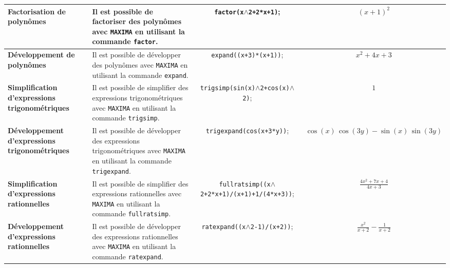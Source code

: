 \documentclass[8pt,landscape]{article}
\begin{document}
\begin{center}
\begin{longtable}{@{}p{4cm}p{10cm}cc@{}}
\midrule

\textbf{Factorisation de polynômes} & Il est possible de factoriser des polynômes avec \texttt{MAXIMA} en utilisant la commande \texttt{factor}. & \texttt{factor(x$\wedge$2+2*x+1)}; & $(x+1)^2$ \\

\midrule

\textbf{Développement de polynômes} & Il est possible de développer des polynômes avec \texttt{MAXIMA} en utilisant la commande \texttt{expand}. & \texttt{expand((x+3)*(x+1))}; & $x^2+4x+3$ \\

\midrule

\textbf{Simplification d'expressions trigonométriques} & Il est possible de simplifier des expressions trigonométriques avec \texttt{MAXIMA} en utilisant la commande \texttt{trigsimp}. & \texttt{trigsimp(sin(x)$\wedge$2+cos(x)$\wedge$2)}; & $1$ \\

\midrule

\textbf{Développement d'expressions trigonométriques} & Il est possible de développer des expressions trigonométriques avec \texttt{MAXIMA} en utilisant la commande \texttt{trigexpand}. & \texttt{trigexpand(cos(x+3*y))}; & $\cos{(x)}\,\cos{(3y)}-\sin{(x)}\,\sin{(3y)}$ \\

\midrule

\textbf{Simplification d'expressions rationnelles} & Il est possible de simplifier des expressions rationnelles avec \texttt{MAXIMA} en utilisant la commande \texttt{fullratsimp}. & \tiny{\texttt{fullratsimp((x$\wedge$2+2*x+1)/(x+1)+1/(4*x+3))}}; & $\frac{4{{x}^{2}}+7x+4}{4x+3}$ \\

\midrule

\textbf{Développement d'expressions rationnelles} & Il est possible de développer des expressions rationnelles avec \texttt{MAXIMA} en utilisant la commande \texttt{ratexpand}. & \texttt{ratexpand((x$\wedge$2-1)/(x+2))}; & $\frac{{{x}^{2}}}{x+2}-\frac{1}{x+2}$ \\

\bottomrule
\end{longtable}
\end{center}
\end{document}
